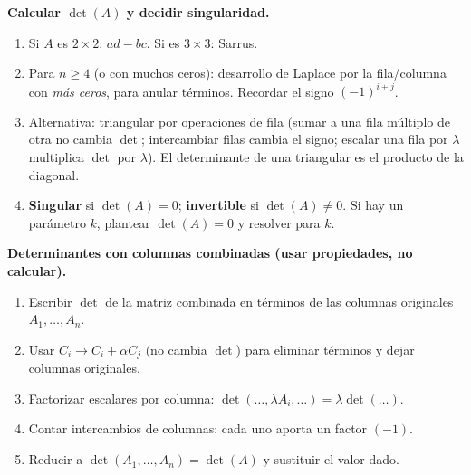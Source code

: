 \begin{receta}
\textbf{Calcular $\det(A)$ y decidir singularidad.}
\begin{enumerate}
  \item Si $A$ es $2\times2$: $ad-bc$. Si es $3\times3$: Sarrus.
  \item Para $n\ge4$ (o con muchos ceros): desarrollo de Laplace por la fila/columna con \emph{más ceros}, para anular términos. Recordar el signo $(-1)^{i+j}$.
  \item Alternativa: triangular por operaciones de fila (sumar a una fila múltiplo de otra no cambia $\det$; intercambiar filas cambia el signo; escalar una fila por $\lambda$ multiplica $\det$ por $\lambda$). El determinante de una triangular es el producto de la diagonal.
  \item \textbf{Singular} si $\det(A)=0$; \textbf{invertible} si $\det(A)\neq0$. Si hay un parámetro $k$, plantear $\det(A)=0$ y resolver para $k$.
\end{enumerate}
\end{receta}

\begin{receta}
\textbf{Determinantes con columnas combinadas (usar propiedades, no calcular).}
\begin{enumerate}
  \item Escribir $\det$ de la matriz combinada en términos de las columnas originales $A_1,\dots,A_n$.
  \item Usar $C_i \to C_i + \alpha C_j$ (no cambia $\det$) para eliminar términos y dejar columnas originales.
  \item Factorizar escalares por columna: $\det(\dots,\lambda A_i,\dots) = \lambda\det(\dots)$.
  \item Contar intercambios de columnas: cada uno aporta un factor $(-1)$.
  \item Reducir a $\det(A_1,\dots,A_n) = \det(A)$ y sustituir el valor dado.
\end{enumerate}
\end{receta}

